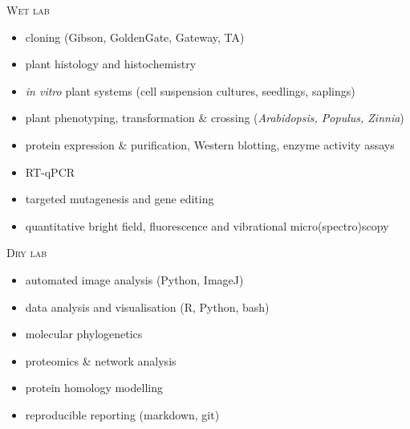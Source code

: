 \documentclass[11pt]{article}
\begin{document}
\textsc{\large{Wet lab}} 
\vspace{-0.175cm}
\begin{addmargin}[24pt]{0pt}
	\begin{multicols}{2}
		\raggedright
		\begin{itemize}[itemindent=-9pt,leftmargin=24pt]
			\itemsep-0.1cm
			\item cloning (Gibson, GoldenGate, Gateway, TA)
			\item plant histology and histochemistry
			\item \textit{in vitro} plant systems (cell suspension cultures, seedlings, saplings)
			\item plant phenotyping, transformation \& crossing (\textit{Arabidopsis, Populus, Zinnia})
			\item protein expression \& purification, Western blotting, enzyme activity assays
			\item RT-qPCR
			\item targeted mutagenesis and gene editing
			\item quantitative bright field, fluorescence and vibrational micro(spectro)scopy
		\end{itemize}
	\end{multicols}
\end{addmargin}
\vspace{0.2cm}

\textsc{\large{Dry lab}} 
\vspace{-0.175cm}
\begin{addmargin}[24pt]{0pt}
	\begin{multicols}{2}
		\raggedright
		\begin{itemize}[itemindent=-9pt,leftmargin=24pt]
			\itemsep-0.1cm
			\item automated image analysis (Python, ImageJ)
			\item data analysis and visualisation (R, Python, bash)
			\item molecular phylogenetics
			\item proteomics \& network analysis
			\item protein homology modelling
			\item reproducible reporting (markdown, git)
		\end{itemize}
	\end{multicols}
\end{addmargin}
\vspace{0.5cm}

\newpage
\end{document}
